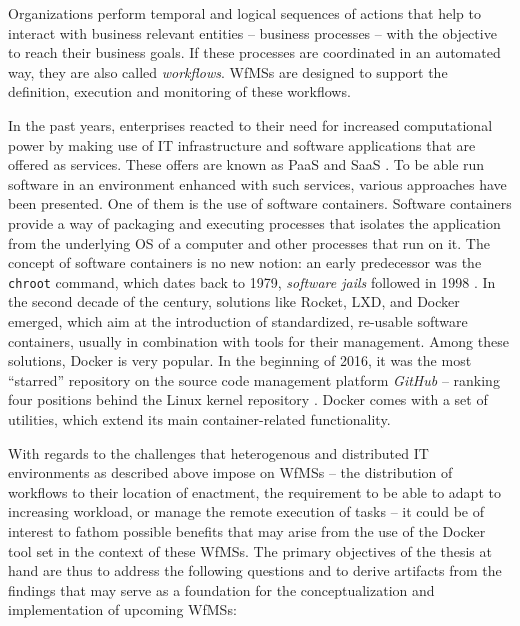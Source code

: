 
Organizations perform temporal and logical sequences of actions that help to interact with business relevant entities -- business processes -- with the objective to reach their business goals. If these processes are coordinated in an automated way, they are also called \emph{workflows}. \acp{WfMS} are designed to support the definition, execution and monitoring of these workflows.

In the past years, enterprises reacted to their need for increased computational power by making use of \ac{IT} infrastructure and software applications that are offered as services. These offers are known as \ac{PaaS} and \ac{SaaS} \cite[p.~606]{Buyya2009Cloud}. To be able run software in an environment enhanced with such services, various approaches have been presented. One of them is the use of software containers.
Software containers provide a way of packaging and executing processes that isolates the application from the underlying \ac{OS} of a computer and other processes that run on it.
The concept of software containers is no new notion: an early predecessor was the \texttt{chroot} command, which dates back to 1979, \emph{software jails} followed in 1998 \cite{Bernstein2014Containers}.
In the second decade of the  century, solutions like Rocket, LXD, and Docker emerged, which aim at the introduction of standardized, re-usable software containers, usually in combination with tools for their management. Among these solutions, Docker is very popular. In the beginning of 2016, it was the  most ``starred'' repository on the source code management platform \emph{GitHub} -- ranking four positions behind the Linux kernel repository \cite{Github2016Repositories}. Docker comes with a set of utilities, which extend its main container-related functionality.

With regards to the challenges that heterogenous and distributed \ac{IT} environments as described above impose on \acp{WfMS} -- \eg the distribution of workflows to their location of enactment, the requirement to be able to adapt to increasing workload, or manage the remote execution of tasks -- it could be of interest to fathom possible benefits that may arise from the use of the Docker tool set in the context of these \acp{WfMS}. The primary objectives of the thesis at hand are thus to address the following questions and to derive artifacts from the findings that may serve as a foundation for the conceptualization and implementation of upcoming \acp{WfMS}:

